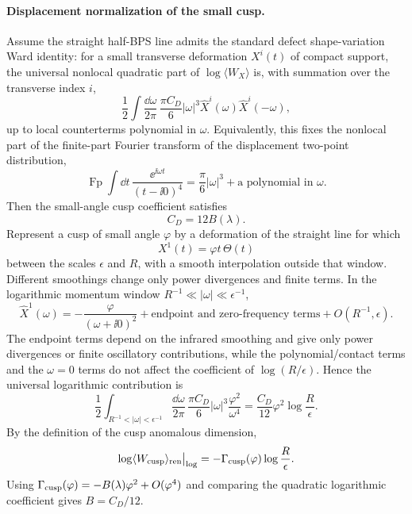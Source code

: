 \paragraph{Displacement normalization of the small cusp.}
Assume the straight half-BPS line admits the standard defect shape-variation
Ward identity: for a small transverse deformation \(X^i(t)\) of compact
support, the universal nonlocal quadratic part of
\(\log\langle W_X\rangle\) is, with summation over the transverse index \(i\),
\[
  \frac12
  \int\frac{\dd\omega}{2\pi}\,
  \frac{\pi C_D}{6}|\omega|^3
  \widehat X^i(\omega)\widehat X^i(-\omega),
\]
up to local counterterms polynomial in \(\omega\).  Equivalently, this fixes
the nonlocal part of the finite-part Fourier transform of the displacement
two-point distribution,
\[
  \operatorname{Fp}\int\dd t\,
  \frac{\ee^{\ii\omega t}}{(t-\ii0)^4}
  =
  \frac{\pi}{6}|\omega|^3
  +\text{a polynomial in }\omega .
\]
Then the small-angle cusp coefficient satisfies
\[
  C_D=12B(\lambda).
\]
Represent a cusp of small angle \(\varphi\) by a deformation of the straight
line for which
\[
  X^1(t)=\varphi t\,\Theta(t)
\]
between the scales \(\epsilon\) and \(R\), with a smooth interpolation outside
that window.  Different smoothings change only power divergences and finite
terms.  In the logarithmic momentum window \(R^{-1}\ll |\omega|\ll
\epsilon^{-1}\),
\[
  \widehat X^1(\omega)
  =
  -\frac{\varphi}{(\omega+\ii0)^2}
  +\text{endpoint and zero-frequency terms}
  +O(R^{-1},\epsilon).
\]
The endpoint terms depend on the infrared smoothing and give only power
divergences or finite oscillatory contributions, while the polynomial/contact
terms and the \(\omega=0\) terms do not affect the coefficient of
\(\log(R/\epsilon)\).  Hence the universal logarithmic contribution is
\[
  \frac12
  \int_{R^{-1}<|\omega|<\epsilon^{-1}}
  \frac{\dd\omega}{2\pi}\,
  \frac{\pi C_D}{6}|\omega|^3
  \frac{\varphi^2}{\omega^4}
  =
  \frac{C_D}{12}\varphi^2\log\frac{R}{\epsilon}.
\]
By the definition of the cusp anomalous dimension,
\[
  \log\langle W_{\rm cusp}\rangle_{\rm ren}\big|_{\log}
  =
  -\Gamma_{\rm cusp}(\varphi)\log\frac{R}{\epsilon}.
\]
Using
\(\Gamma_{\rm cusp}(\varphi)=-B(\lambda)\varphi^2+O(\varphi^4)\) and comparing
the quadratic logarithmic coefficient gives \(B=C_D/12\).

